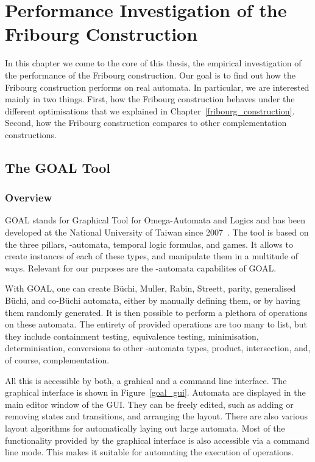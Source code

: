 \chapter{Performance Investigation of the Fribourg Construction}
\label{experiment}
In this chapter we come to the core of this thesis, the empirical investigation of the performance of the Fribourg construction. Our goal is to find out how the Fribourg construction performs on real automata. In particular, we are interested mainly in two things. First, how the Fribourg construction behaves under the different optimisations that we explained in Chapter~\ref{fribourg_construction}. Second, how the Fribourg construction compares to other complementation constructions.



\section{The GOAL Tool}
\label{goal}
\subsection{Overview}
GOAL stands for Graphical Tool for Omega-Automata and Logics and has been developed at the National University of Taiwan since 2007~\cite{2007_goal,2008_goal_ext}. The tool is based on the three pillars, \om-automata, temporal logic formulas, and games. It allows to create instances of each of these types, and manipulate them in a multitude of ways. Relevant for our purposes are the \om-automata capabilites of GOAL.

With GOAL, one can create Büchi, Muller, Rabin, Streett, parity, generalised Büchi, and co-Büchi automata, either by manually defining them, or by having them randomly generated. It is then possible to perform a plethora of operations on these automata. The entirety of provided operations are too many to list, but they include containment testing, equivalence testing, minimisation, determinisation, conversions to other \om-automata types, product, intersection, and, of course, complementation.

All this is accessible by both, a grahical and a command line interface. The graphical interface is shown in Figure~\ref{goal_gui}. Automata are displayed in the main editor window of the GUI. They can be freely edited, such as adding or removing states and transitions, and arranging the layout. There are also various layout algorithms for automatically laying out large automata. Most of the functionality provided by the graphical interface is also accessible via a command line mode. This makes it suitable for automating the execution of operations.

